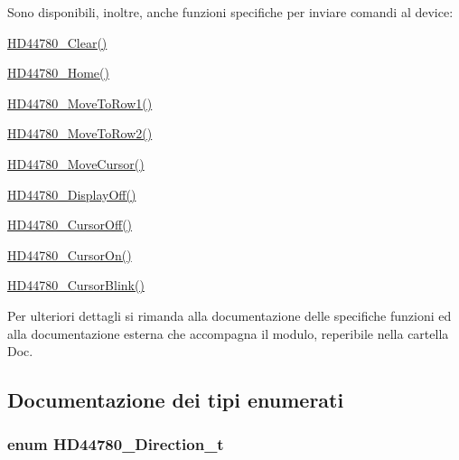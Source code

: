 Sono disponibili, inoltre, anche funzioni specifiche per inviare comandi al device\+:
\begin{DoxyItemize}
\item \hyperlink{group___h_d44780_ga38cac13d7a66f068be54f79a716ff7d4}{H\+D44780\+\_\+\+Clear()}
\item \hyperlink{group___h_d44780_ga68e3712332aa9482d4bdaa4991a92127}{H\+D44780\+\_\+\+Home()}
\item \hyperlink{group___h_d44780_gad90e2924a4e632ce42940323f8f49e37}{H\+D44780\+\_\+\+Move\+To\+Row1()}
\item \hyperlink{group___h_d44780_ga713670d498b6f5d50a174df19081c515}{H\+D44780\+\_\+\+Move\+To\+Row2()}
\item \hyperlink{group___h_d44780_gabcea9a03050c46530e39b7556c673baf}{H\+D44780\+\_\+\+Move\+Cursor()}
\item \hyperlink{group___h_d44780_ga5cf07b2179272029410f9a81f56621ed}{H\+D44780\+\_\+\+Display\+Off()}
\item \hyperlink{group___h_d44780_ga56421dc398825188aa10257063a3ee4b}{H\+D44780\+\_\+\+Cursor\+Off()}
\item \hyperlink{group___h_d44780_ga3a381cb44df5d76d79be5ed71a52bae6}{H\+D44780\+\_\+\+Cursor\+On()}
\item \hyperlink{group___h_d44780_ga92eb58cb7d73c9a87b7087a9c56f73d5}{H\+D44780\+\_\+\+Cursor\+Blink()}~\newline

\end{DoxyItemize}

Per ulteriori dettagli si rimanda alla documentazione delle specifiche funzioni ed alla documentazione esterna che accompagna il modulo, reperibile nella cartella Doc. 

\subsection{Documentazione dei tipi enumerati}
\hypertarget{group___h_d44780_gaf46f4db4f981d3a1088804a6d6980d30}{
\subsubsection[{H\+D44780\+\_\+\+Direction\+\_\+t}]{\setlength{\rightskip}{0pt plus 5cm}enum {\bf H\+D44780\+\_\+\+Direction\+\_\+t}}}\label{group___h_d44780_gaf46f4db4f981d3a1088804a6d6980d30}


